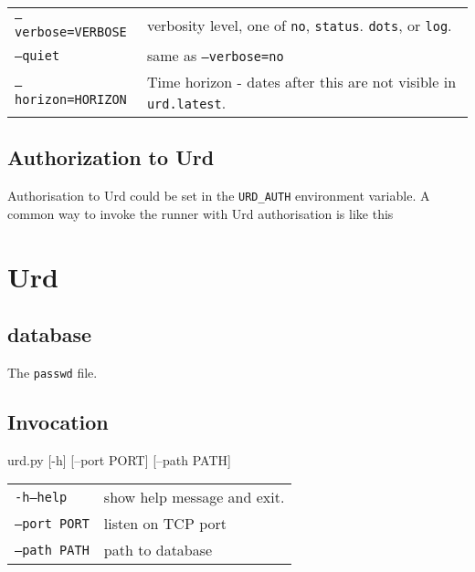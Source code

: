 \begin{snugshade}
\begin{tabular}{p{3cm}p{10cm}}
  \texttt{---verbose=VERBOSE} & verbosity level, one of \texttt{no},
  \texttt{status}. \texttt{dots}, or \texttt{log}.\\[4ex]

  \texttt{---quiet} & same as \texttt{---verbose=no}\\[4ex]

  \texttt{---horizon=HORIZON} & Time horizon - dates after this are
  not visible in \texttt{urd.latest}.\\[4ex]
\end{tabular}
\end{snugshade}


\subsection{Authorization to Urd}
Authorisation to Urd could be set in the \texttt{URD\_AUTH}
environment variable.  A common way to invoke the runner with Urd
authorisation is like this
\begin{shell}
\end{shell}



\clearpage
\section{Urd}

\subsection{database}

The \texttt{passwd} file.


\subsection{Invocation}
\begin{shell}
urd.py [-h] [--port PORT] [--path PATH]
\end{shell}

\begin{snugshade}
\begin{tabular}{p{3cm}p{10cm}}
  \texttt{-h}\hspace{2cm}\texttt{---help} & show help message and
  exit.\\[4ex]

  \texttt{---port PORT} & listen on TCP port\\[4ex]

  \texttt{---path PATH} & path to database\\[4ex]
\end{tabular}
\end{snugshade}



